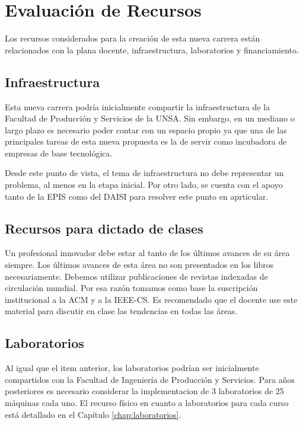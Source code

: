 \chapter{Evaluación de Recursos}\label{chap:cs-resources}

Los recursos considerados para la creación de esta nueva carrera están relacionados con la plana docente, infraestructura, laboratorios y financiamiento.

\OnlyPeruUNSA{}

\section{Infraestructura}\label{sec:cs-infraestructura}
Esta nueva carrera podría inicialmente compartir la infraestructura de la Facultad de Producción y Servicios de la UNSA. Sin embargo, en un mediano o largo plazo es necesario poder contar con un espacio propio ya que una de las principales tareas de esta nueva propuesta es la de servir como incubadora de empresas de base tecnológica. 

Desde este punto de vista, el tema de infraestructura no debe representar un problema, al menos en la etapa inicial.
Por otro lado, se cuenta con el apoyo tanto de la EPIS como del DAISI para resolver este punto en aprticular.

\section{Recursos para dictado de clases}
Un profesional innovador debe estar al tanto de los últimos avances de su área siempre. Los últimos avances de esta área no son presentados en los libros necesariamente. Debemos utilizar publicaciones de revistas indexadas de circulación mundial. Por esa razón tomamos como base la suscripción institucional a la ACM y a la IEEE-CS. Es recomendado que el docente use este material para discutir en clase las tendencias en todas las áreas.

\section{Laboratorios}\label{sec:cs-labs}
Al igual que el item anterior, los laboratorios podrían ser inicialmente compartidos con la Facultad de Ingeniería de Producción y Servicios. Para años posteriores es necesario considerar la implementacion de 3 laboratorios de 25 máquinas cada uno. El recurso físico en cuanto a laboratorios para cada curso está detallado en el Capítulo \ref{chap:laboratorios}.

